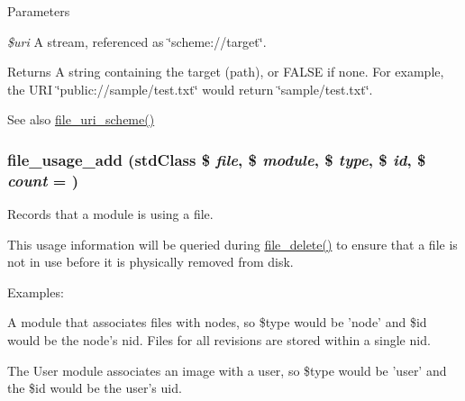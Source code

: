\begin{DoxyParams}{Parameters}
\item[{\em \$uri}]A stream, referenced as \char`\"{}scheme://target\char`\"{}.\end{DoxyParams}
\begin{DoxyReturn}{Returns}
A string containing the target (path), or FALSE if none. For example, the URI \char`\"{}public://sample/test.txt\char`\"{} would return \char`\"{}sample/test.txt\char`\"{}.
\end{DoxyReturn}
\begin{DoxySeeAlso}{See also}
\hyperlink{group__file_gaa98f967fe1033030e7e5262adda85463}{file\_\-uri\_\-scheme()} 
\end{DoxySeeAlso}
\hypertarget{group__file_ga41a98960234fa8f802cfc1c4c769ae05}{
\subsubsection[{file\_\-usage\_\-add}]{\setlength{\rightskip}{0pt plus 5cm}file\_\-usage\_\-add (stdClass \$ {\em file}, \/  \$ {\em module}, \/  \$ {\em type}, \/  \$ {\em id}, \/  \$ {\em count} = {})}}
\label{group__file_ga41a98960234fa8f802cfc1c4c769ae05}
Records that a module is using a file.

This usage information will be queried during \hyperlink{group__file_gac7503f0dcdea965d68e4a242e7760921}{file\_\-delete()} to ensure that a file is not in use before it is physically removed from disk.

Examples:
\begin{DoxyItemize}
\item A module that associates files with nodes, so \$type would be 'node' and \$id would be the node's nid. Files for all revisions are stored within a single nid.
\item The User module associates an image with a user, so \$type would be 'user' and the \$id would be the user's uid.
\end{DoxyItemize}


